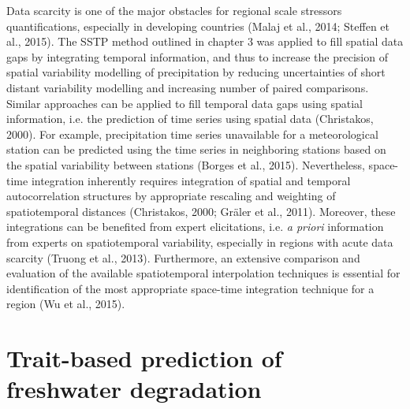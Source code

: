 Data scarcity is one of the major obstacles for regional scale stressors quantifications, especially in developing countries (Malaj et al., 2014; Steffen et al., 2015). The SSTP method outlined in chapter 3 was applied to fill spatial data gaps by integrating temporal information, and thus to increase the precision of spatial variability modelling of precipitation by reducing uncertainties of short distant variability modelling and increasing number of paired comparisons. Similar approaches can be applied to fill temporal data gaps using spatial information, i.e. the prediction of time series using spatial data (Christakos, 2000). For example, precipitation time series unavailable for a meteorological station can be predicted using the time series in neighboring stations based on the spatial variability between stations (Borges et al., 2015). Nevertheless, space-time integration inherently requires integration of spatial and temporal autocorrelation structures by appropriate rescaling and weighting of spatiotemporal distances (Christakos, 2000; Gräler et al., 2011). Moreover, these integrations can be benefited from expert elicitations, i.e. \textit{a priori} information from experts on spatiotemporal variability, especially in regions with acute data scarcity (Truong et al., 2013). Furthermore, an extensive comparison and evaluation of the available spatiotemporal interpolation techniques is essential for identification of the most appropriate space-time integration technique for a region (Wu et al., 2015).

\section{Trait-based prediction of freshwater degradation}
\label{Trait-based prediction of freshwater degradation}

